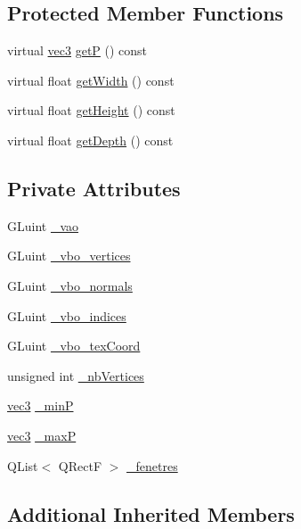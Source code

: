 \subsection*{Protected Member Functions}
\begin{DoxyCompactItemize}
\item 
virtual \hyperlink{structvec3}{vec3} \hyperlink{class_plan_a2561b08d2e0f333c56d7ac2b5cc72fd7}{get\+P} () const 
\item 
virtual float \hyperlink{class_plan_aa64cc1ec4e6d1660c691592eb441e00c}{get\+Width} () const 
\item 
virtual float \hyperlink{class_plan_a73316993ed03bbf13b38f2dff76b0ced}{get\+Height} () const 
\item 
virtual float \hyperlink{class_plan_a086041dcf2879904e774f34ae4ad61d7}{get\+Depth} () const 
\end{DoxyCompactItemize}
\subsection*{Private Attributes}
\begin{DoxyCompactItemize}
\item 
G\+Luint \hyperlink{class_plan_ab4efe8532b73dd0efca80000afb0027d}{\+\_\+vao}
\item 
G\+Luint \hyperlink{class_plan_a7b203dc36964da663836cf7614fe711a}{\+\_\+vbo\+\_\+vertices}
\item 
G\+Luint \hyperlink{class_plan_aa5db33661be2dfcecf68683c33eb22b9}{\+\_\+vbo\+\_\+normals}
\item 
G\+Luint \hyperlink{class_plan_ad8791ad67d66ac1b24792dc72ec00c64}{\+\_\+vbo\+\_\+indices}
\item 
G\+Luint \hyperlink{class_plan_a3c16becd29f35260b79af8b9cb6fa892}{\+\_\+vbo\+\_\+tex\+Coord}
\item 
unsigned int \hyperlink{class_plan_af3d9228c1b7dc91c0cb00d4c8fa5a550}{\+\_\+nb\+Vertices}
\item 
\hyperlink{structvec3}{vec3} \hyperlink{class_plan_aad9837a269e87fa5d7a4a5fc90abf3e7}{\+\_\+min\+P}
\item 
\hyperlink{structvec3}{vec3} \hyperlink{class_plan_a2dce54e58d00f40ed8da5c9bd34c1232}{\+\_\+max\+P}
\item 
Q\+List$<$ Q\+Rect\+F $>$ \hyperlink{class_plan_aa9fdbf8efac3f80ffd8bb2f789e7f4f2}{\+\_\+fenetres}
\end{DoxyCompactItemize}
\subsection*{Additional Inherited Members}


